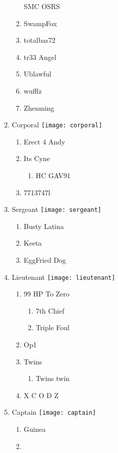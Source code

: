 \documentclass{article}
\begin{document}
\begin{enumerate}[I]
\begin{enumerate}[I]
	SMC OSRS
      \item
	SwampFox
      \item
	totalbas72
      \item
	tr33 Angel
      \item
	Ublawful
      \item
	wufflz
      \item
	Zhenming
    \end{enumerate}
  \item
    Corporal \texttt{[image: corporal]}
    \begin{enumerate}[I]
      \item
	Erect 4 Andy
      \item
	Its Cyne
	\begin{enumerate}[I]
	  \item
	    HC GAV91
	\end{enumerate}
      \item
	7713747l
    \end{enumerate}
  \item
    Sergeant \texttt{[image: sergeant]}
    \begin{enumerate}[I]
      \item
	Busty Latina
      \item
	Keeta
      \item
	EggFried Dog
    \end{enumerate}
  \item
    Lieutenant \texttt{[image: lieutenant]}
    \begin{enumerate}[I]
      \item 
	99 HP To Zero
	\begin{enumerate}[I]
	  \item
	    7th Chief
	  \item
	    Triple Foul
	\end{enumerate}
      \item
	Op1
      \item
	Twins
	  \begin{enumerate}[I]
	    \item
	      Twins twin
	  \end{enumerate}
      \item
	X C O D Z
    \end{enumerate}
  \item
    Captain \texttt{[image: captain]}
    \begin{enumerate}[I]
      \item
	Guinea
      \item

\end{enumerate}
\end{enumerate}
\end{document}
